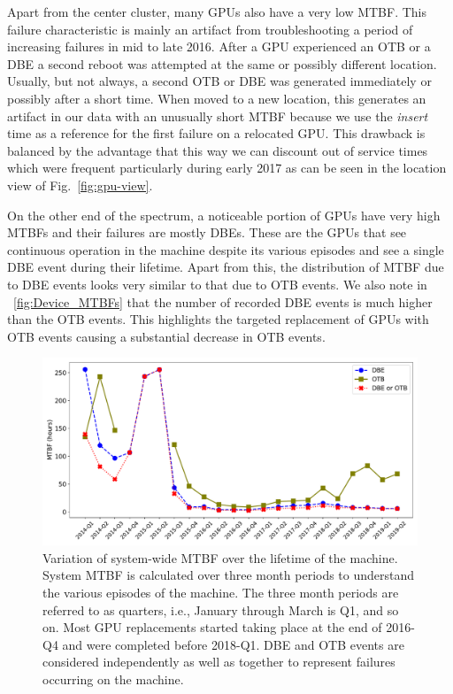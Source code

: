 Apart from the center cluster, many GPUs also have a very 
low MTBF. This failure characteristic is mainly an artifact from
troubleshooting a period of increasing failures in mid to late 2016.
After a GPU experienced an OTB or a DBE a second reboot was attempted at
the same or possibly different location. Usually, but not always, a
second OTB or DBE was generated immediately or possibly after a short
time. When moved to a new location, this generates an artifact in our
data with an unusually short MTBF because we use the {\em insert} time as
a reference for the first failure on a relocated GPU. This drawback is
balanced by the advantage that this way we can discount out of service times
which were frequent particularly during early 2017 as can be seen in
the location view of Fig.~\ref{fig:gpu-view}.

On the other end of the spectrum, a noticeable portion of GPUs have very high
MTBFs and their failures are mostly DBEs. These are the GPUs that see continuous operation in the machine 
despite its various episodes and see a single DBE event during their lifetime.
Apart from this, the distribution of MTBF due to DBE events looks very similar to that due 
to OTB events. We also note in ~\ref{fig:Device_MTBFs} that the number of recorded 
DBE events is much higher than the OTB events. This highlights the targeted replacement of GPUs 
with OTB events causing a substantial decrease in OTB events.  

\begin{figure}[bt]
  \begin{center}
    \includegraphics[trim={0 1em 0 1em},clip,width=\columnwidth]{figs/MTBF_quaterly_sys.pdf}
  \end{center}
  \caption{Variation of system-wide MTBF over the lifetime of the machine. System MTBF is calculated over 
three month periods to understand the various episodes of the machine. The three month periods are 
referred to as quarters, i.e., January through March is Q1, and so on. Most GPU replacements started taking 
place at the end of 2016-Q4 and were completed before 2018-Q1. DBE and OTB events are 
considered independently as well as together to represent failures occurring on the machine.}
  \label{fig:MTBF_sys}
\end{figure}

